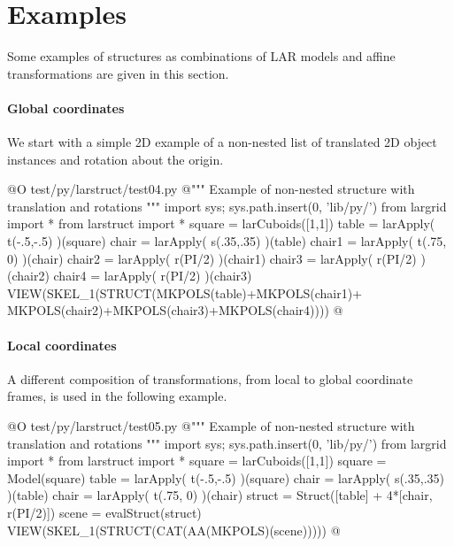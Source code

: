 \documentclass[11pt,oneside]{article}    %
\begin{document}
\section{Examples}
Some examples of structures as combinations of LAR models and affine transformations are given in this section. 

\paragraph{Global coordinates}
We start with a simple 2D example of a non-nested list of translated 2D object instances and rotation about the origin.

@O test/py/larstruct/test04.py
@{""" Example of non-nested structure with translation and rotations """
import sys; sys.path.insert(0, 'lib/py/')
from largrid import *
from larstruct import *
square = larCuboids([1,1])
table = larApply( t(-.5,-.5) )(square)
chair = larApply( s(.35,.35) )(table)
chair1 = larApply( t(.75, 0) )(chair)
chair2 = larApply( r(PI/2) )(chair1)
chair3 = larApply( r(PI/2) )(chair2)
chair4 = larApply( r(PI/2) )(chair3)
VIEW(SKEL_1(STRUCT(MKPOLS(table)+MKPOLS(chair1)+
                   MKPOLS(chair2)+MKPOLS(chair3)+MKPOLS(chair4))))
@}

\paragraph{Local coordinates}
A different composition of transformations, from local to global coordinate frames, is used in the following example.

@O test/py/larstruct/test05.py
@{""" Example of non-nested structure with translation and rotations """
import sys; sys.path.insert(0, 'lib/py/')
from largrid import *
from larstruct import *
square = larCuboids([1,1])
square = Model(square)
table = larApply( t(-.5,-.5) )(square)
chair = larApply( s(.35,.35) )(table)
chair = larApply( t(.75, 0) )(chair)
struct = Struct([table] + 4*[chair, r(PI/2)])
scene = evalStruct(struct)
VIEW(SKEL_1(STRUCT(CAT(AA(MKPOLS)(scene)))))
@}
\end{document}
